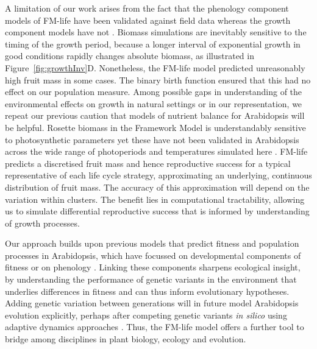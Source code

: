 A limitation of our work arises from the fact that the phenology component
models of FM-life have been validated against field data
\citep{wilczek_effects_2009,burghardt_modeling_2015} whereas the growth
component models have not
\citep{rasse_leaf_2006,christophe_model-based_2008}. Biomass simulations are
inevitably sensitive to the timing of the growth period, because a longer
interval of exponential growth in good conditions rapidly changes absolute
biomass, as illustrated in Figure~\ref{fig:growthInv}D. Nonetheless, the FM-life
model predicted unreasonably high fruit mass in some cases. The binary birth
function ensured that this had no effect on our population measure. Among
possible gaps in understanding of the environmental effects on growth in natural
settings or in our representation, we repeat our previous caution
\citep{chew_multiscale_2014, chew_linking_2017} that models of nutrient balance
for Arabidopsis will be helpful. Rosette biomass in the Framework Model is
understandably sensitive to photosynthetic parameters
\citep{chew_multiscale_2014} yet these have not been validated in Arabidopsis
across the wide range of photoperiods and temperatures simulated here
\citep{walker_temperature_2013}. FM-life predicts a discretised fruit mass and
hence reproductive success for a typical representative of each life cycle
strategy, approximating an underlying, continuous distribution of fruit
mass. The accuracy of this approximation will depend on the variation within
clusters. The benefit lies in computational tractability, allowing us to
simulate differential reproductive success that is informed by understanding of
growth processes.

Our approach builds upon previous models that predict fitness and population
processes in Arabidopsis, which have focussed on developmental components of
fitness or on phenology
\citep{prusinkiewicz_evolution_2007,satake_forecasting_2013,springthorpe_flowering_2015}. Linking
these components sharpens ecological insight, by understanding the performance
of genetic variants in the environment that underlies differences in fitness
\citep[see discussions in][]{burghardt_modeling_2015, doebeli_towards_2017} and
can thus inform evolutionary hypotheses. Adding genetic variation between
generations will in future model Arabidopsis evolution explicitly, perhaps after
competing genetic variants \emph{in silico} using adaptive dynamics approaches
\citep{brannstrom_hitchhikers_2013, weise_mechanistic_2015}.  Thus, the FM-life
model offers a further tool to bridge among disciplines in plant biology,
ecology and evolution.
